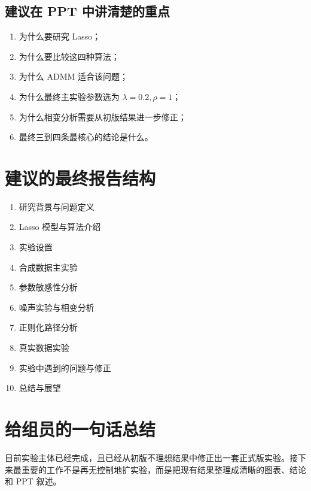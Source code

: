 \documentclass[12pt,a4paper]{ctexart}
\begin{document}
\subsection{建议在 PPT 中讲清楚的重点}
\begin{enumerate}[label=\arabic*.]
    \item 为什么要研究 Lasso；
    \item 为什么要比较这四种算法；
    \item 为什么 ADMM 适合该问题；
    \item 为什么最终主实验参数选为 $\lambda=0.2,\rho=1$；
    \item 为什么相变分析需要从初版结果进一步修正；
    \item 最终三到四条最核心的结论是什么。
\end{enumerate}

\section{建议的最终报告结构}
\begin{enumerate}[label=\arabic*.]
    \item 研究背景与问题定义
    \item Lasso 模型与算法介绍
    \item 实验设置
    \item 合成数据主实验
    \item 参数敏感性分析
    \item 噪声实验与相变分析
    \item 正则化路径分析
    \item 真实数据实验
    \item 实验中遇到的问题与修正
    \item 总结与展望
\end{enumerate}

\section{给组员的一句话总结}
目前实验主体已经完成，且已经从初版不理想结果中修正出一套正式版实验。接下来最重要的工作不是再无控制地扩实验，而是把现有结果整理成清晰的图表、结论和 PPT 叙述。
\end{document}
